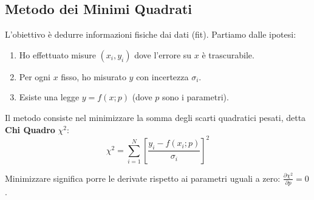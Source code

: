 \documentclass[openany,a4paper,12pt]{book}
\theoremstyle{remark}
\begin{document}
\subsection{Metodo dei Minimi Quadrati}

L'obiettivo è dedurre informazioni fisiche dai dati (fit). Partiamo dalle ipotesi:
\begin{enumerate}
    \item Ho effettuato misure $(x_i, y_i)$ dove l'errore su $x$ è trascurabile.
    \item Per ogni $x$ fisso, ho misurato $y$ con incertezza $\sigma_i$.
    \item Esiste una legge $y = f(x; p)$ (dove $p$ sono i parametri).
\end{enumerate}

Il metodo consiste nel minimizzare la somma degli scarti quadratici pesati, detta \textbf{Chi Quadro} $\chi^2$:
\begin{equation}
    \chi^2 = \sum_{i=1}^{N} \left[ \frac{y_i - f(x_i; p)}{\sigma_i} \right]^2
\end{equation}

Minimizzare significa porre le derivate rispetto ai parametri uguali a zero: $\frac{\partial \chi^2}{\partial p} = 0$.
\end{document}
